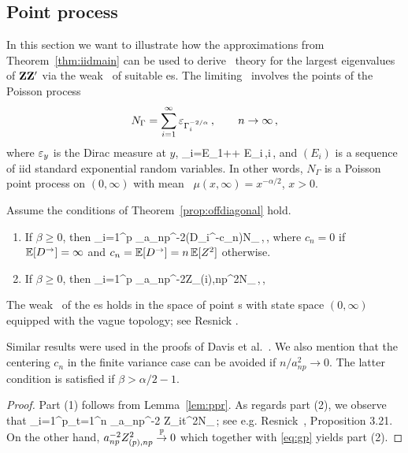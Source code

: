 \subsection{Point process \con }\label{sec:ppconvergence}
In this section we want to illustrate how the approximations from Theorem~\ref{thm:iidmain} can be used
to derive \asy\ theory for the largest eigenvalues of ${\mathbf Z}{\mathbf Z}'$ via the weak \con\ of suitable \pp es.
The limiting \pp\ involves the points of the Poisson process
\begin{equation}\label{eq:N}
N_\Gamma=\sum_{i=1}^\infty \varepsilon_{\Gamma_i^{-2/\alpha}}\,,\qquad n \to \infty\,,
\end{equation}
where $\varepsilon_y$ is the Dirac measure at $y$, 
\beao%
\Gamma_i=E_1+\cdots + E_i\,,\qquad i\,,
\eeao
and $(E_i)$ is a sequence of iid standard exponential random variables. In other words, $N_\Gamma$ is a Poisson point process on $(0,\infty)$ with mean \ms\
$\mu(x,\infty)= x^{-\alpha/2}$, $x>0$.
\par
\begin{lemma}\label{lem:pp}
Assume the conditions of Theorem~\ref{prop:offdiagonal} hold. 
\begin{enumerate}
\item
If $\beta\ge 0$, then
\beam\label{eq:immb}
\sum_{i=1}^p \vep_{a_{np}^{-2}(D_i^\rightarrow-c_n)}\cid N_\Gamma\,,\qquad \nto\,,
\eeam  
where $c_n=0$ if $\mathbb{E}[D^\rightarrow]=\infty$ and $c_n=\mathbb{E}[D^\rightarrow]=n\,\mathbb{E}[Z^2]$ otherwise. 
\item
If $\beta\ge 0$, then
\beam\label{eq:imma}
\sum_{i=1}^p \vep_{a_{np}^{-2}Z_{(i),np}^2}\cid N_\Gamma\,,\qquad \nto\,,
\eeam  
\end{enumerate}
The weak \con\ of the \pp es holds in the space of 
point \ms s with state space $(0,\infty)$ equipped with the vague topology; see Resnick \cite{resnick:2007}.
\end{lemma}
\begin{remark} \rm
Similar results were used in the proofs of Davis et al.~\cite{davis:mikosch:heiny:xie:2015,davis:mikosch:pfaffel:2015}.
We also mention that the centering $c_n$ in the finite variance case can be avoided if $n/a_{np}^2\to 0$. 
The latter condition is satisfied if $\beta>\alpha/2-1$.
\end{remark}
\begin{proof} 
Part (1) follows from Lemma~\ref{lem:ppr}. As regards part (2), we observe that
\beam\label{eq:gp}
\sum_{i=1}^p\sum_{t=1}^n \vep_{a_{np}^{-2} Z_{it}^2}\std N_\Gamma\,;
\eeam
see e.g. Resnick~\cite{resnick:1987}, Proposition 3.21. On the other hand, $a_{np}^{-2} Z_{(p),np}^2\stackrel{\mathbb{P}}{\rightarrow} 0$ which together with
\eqref{eq:gp} yields part (2).
\end{proof}

